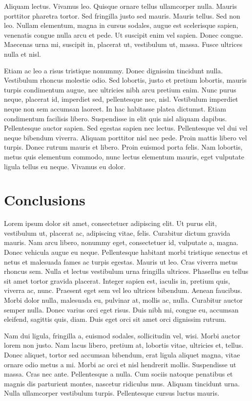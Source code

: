 \documentclass[AMS,STIX2COL]{WileyNJD-v2}
\begin{document}
    Aliquam lectus. Vivamus leo. Quisque ornare tellus ullamcorper nulla. Mauris porttitor pharetra
    tortor. Sed fringilla justo sed mauris. Mauris tellus. Sed non leo. Nullam elementum, magna in cursus sodales, augue
    est scelerisque sapien, venenatis congue nulla arcu et pede. Ut suscipit enim vel sapien. Donec congue. Maecenas
    urna mi, suscipit in, placerat ut, vestibulum ut, massa. Fusce ultrices nulla et nisl.

    Etiam ac leo a risus tristique nonummy. Donec dignissim tincidunt nulla. Vestibulum rhoncus molestie odio. Sed
    lobortis, justo et pretium lobortis, mauris turpis condimentum augue, nec ultricies nibh arcu pretium enim. Nunc
    purus neque, placerat id, imperdiet sed, pellentesque nec, nisl. Vestibulum imperdiet neque non sem accumsan laoreet.
    In hac habitasse platea dictumst. Etiam condimentum facilisis libero. Suspendisse in elit quis nisl aliquam dapibus.
    Pellentesque auctor sapien. Sed egestas sapien nec lectus. Pellentesque vel dui vel neque bibendum viverra. Aliquam
    porttitor nisl nec pede. Proin mattis libero vel turpis. Donec rutrum mauris et libero. Proin euismod porta felis.
    Nam lobortis, metus quis elementum commodo, nunc lectus elementum mauris, eget vulputate ligula tellus eu neque.
    Vivamus eu dolor.


    \section{Conclusions}\label{sec5}

    Lorem ipsum dolor sit amet, consectetuer adipiscing elit. Ut purus elit, vestibulum ut, placerat ac, adipiscing vitae,
    felis. Curabitur dictum gravida mauris. Nam arcu libero, nonummy eget, consectetuer id, vulputate a, magna. Donec
    vehicula augue eu neque. Pellentesque habitant morbi tristique senectus et netus et malesuada fames ac turpis egestas.
    Mauris ut leo. Cras viverra metus rhoncus sem. Nulla et lectus vestibulum urna fringilla ultrices. Phasellus eu tellus
    sit amet tortor gravida placerat. Integer sapien est, iaculis in, pretium quis, viverra ac, nunc. Praesent eget sem vel
    leo ultrices bibendum. Aenean faucibus. Morbi dolor nulla, malesuada eu, pulvinar at, mollis ac, nulla. Curabitur
    auctor semper nulla. Donec varius orci eget risus. Duis nibh mi, congue eu, accumsan eleifend, sagittis quis, diam.
    Duis eget orci sit amet orci dignissim rutrum.

    Nam dui ligula, fringilla a, euismod sodales, sollicitudin vel, wisi. Morbi auctor lorem non justo. Nam lacus libero,
    pretium at, lobortis vitae, ultricies et, tellus. Donec aliquet, tortor sed accumsan bibendum, erat ligula aliquet magna,
    vitae ornare odio metus a mi. Morbi ac orci et nisl hendrerit mollis. Suspendisse ut massa. Cras nec ante. Pellentesque
    a nulla. Cum sociis natoque penatibus et magnis dis parturient montes, nascetur ridiculus mus. Aliquam tincidunt
    urna. Nulla ullamcorper vestibulum turpis. Pellentesque cursus luctus mauris.
\end{document}
